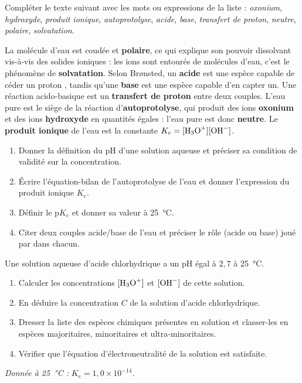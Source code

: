 \documentclass[11pt]{article}
\newcounter{popsec}
\newcounter{popsub}
\newcommand{\courssub}[1]{%
  \stepcounter{popsub}%
  \par\vspace{9pt}\noindent{\popxbold\fontsize{11.5}{13}\selectfont\color{popink}{\color{poporange}\thepopsec.\thepopsub}\hspace{6pt}#1}\par\nopagebreak\vspace{4pt}
}
\begin{document}
\begin{exercice}
Compléter le texte suivant avec les mots ou expressions de la liste : \emph{oxonium}, \emph{hydroxyde}, \emph{produit ionique}, \emph{autoprotolyse}, \emph{acide}, \emph{base}, \emph{transfert de proton}, \emph{neutre}, \emph{polaire}, \emph{solvatation}.

\medskip
La molécule d'eau est coudée et \textbf{polaire}, ce qui explique son pouvoir dissolvant vis-à-vis des solides ioniques : les ions sont entourés de molécules d'eau, c'est le phénomène de \textbf{solvatation}. Selon Brønsted, un \textbf{acide} est une espèce capable de céder un proton , tandis qu'une \textbf{base} est une espèce capable d'en capter un. Une réaction acido-basique est un \textbf{transfert de proton} entre deux couples. L'eau pure est le siège de la réaction d'\textbf{autoprotolyse}, qui produit des ions \textbf{oxonium}  et des ions \textbf{hydroxyde}  en quantités égales : l'eau pure est donc \textbf{neutre}. Le \textbf{produit ionique} de l'eau est la constante $K_e = [\ce{H3O+}][\ce{OH-}]$.
\end{exercice}

\begin{exercice}
\begin{enumerate}
\item Donner la définition du pH d'une solution aqueuse et préciser sa condition de validité sur la concentration.
\item Écrire l'équation-bilan de l'autoprotolyse de l'eau et donner l'expression du produit ionique $K_e$.
\item Définir le p$K_e$ et donner sa valeur à \SI{25}{\celsius}.
\item Citer deux couples acide/base de l'eau et préciser le rôle (acide ou base) joué par  dans chacun.
\end{enumerate}
\end{exercice}

\courssub{Je m'entraîne}

\begin{exercice}
Une solution aqueuse d'acide chlorhydrique  a un pH égal à $2{,}7$ à \SI{25}{\celsius}.
\begin{enumerate}
\item Calculer les concentrations $[\ce{H3O+}]$ et $[\ce{OH-}]$ de cette solution.
\item En déduire la concentration $C$ de la solution d'acide chlorhydrique.
\item Dresser la liste des espèces chimiques présentes en solution et classer-les en espèces majoritaires, minoritaires et ultra-minoritaires.
\item Vérifier que l'équation d'électroneutralité de la solution est satisfaite.
\end{enumerate}
\emph{Donnée à \SI{25}{\celsius} :} $K_e = 1{,}0 \times 10^{-14}$.
\end{exercice}
\end{document}
